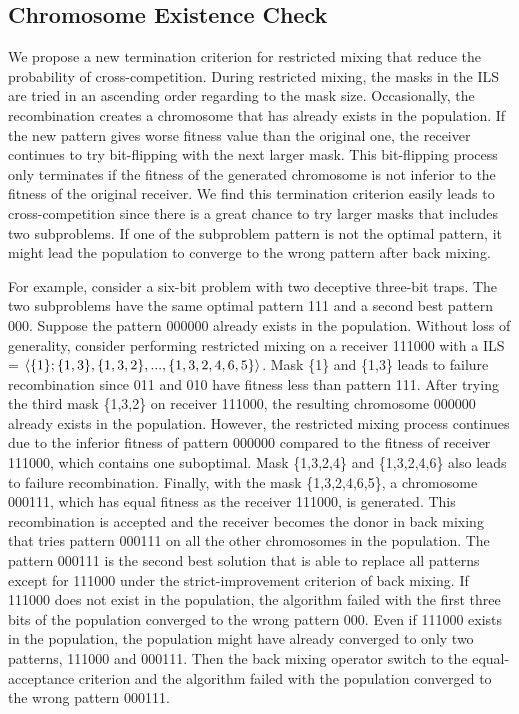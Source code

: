 \documentclass{sig-alternate-05-2015}
\begin{document}
\subsection{Chromosome Existence Check}

We propose a new termination criterion for restricted mixing that reduce the probability of cross-competition. During restricted mixing, the masks in the ILS are tried in an ascending order regarding to the mask size. Occasionally, the recombination creates a chromosome that has already exists in the population. If the new pattern gives worse fitness value than the original one, the receiver continues to try bit-flipping with the next larger mask. This bit-flipping process only terminates if the fitness of the generated chromosome is not inferior to the fitness of the original receiver. We find this termination criterion easily leads to cross-competition since there is a great chance to try larger masks that includes two subproblems. If one of the subproblem pattern is not the optimal pattern, it might lead the population to converge to the wrong pattern after back mixing.

For example, consider a six-bit problem with two deceptive three-bit traps. The two subproblems have the same optimal pattern 111 and a second best pattern 000. Suppose the pattern 000000 already exists in the population. Without loss of generality, consider performing restricted mixing on a receiver 111000 with a ILS = $\langle\{1\};\{1,3\}, \{1,3,2\}, ...,\\ \{1,3,2,4,6,5\}\rangle$. Mask \{1\} and \{1,3\} leads to failure recombination since 011 and 010 have fitness less than pattern 111. After trying the third mask \{1,3,2\} on receiver 111000, the resulting chromosome 000000 already exists in the population. However, the restricted mixing process continues due to the inferior fitness of pattern 000000 compared to the fitness of receiver 111000, which contains one suboptimal. Mask \{1,3,2,4\} and \{1,3,2,4,6\} also leads to failure recombination. Finally, with the mask \{1,3,2,4,6,5\}, a chromosome 000111, which has equal fitness as the receiver 111000, is generated. This recombination is accepted and the receiver becomes the donor in back mixing that tries pattern 000111 on all the other chromosomes in the population. The pattern 000111 is the second best solution that is able to replace all patterns except for 111000 under the strict-improvement criterion of back mixing. If 111000 does not exist in the population, the algorithm failed with the first three bits of the population converged to the wrong pattern 000.  Even if 111000 exists in the population, the population might have already converged to only two patterns, 111000 and 000111. Then the back mixing operator switch to the equal-acceptance criterion and the algorithm failed with the population converged to the wrong pattern 000111.
\end{document}
